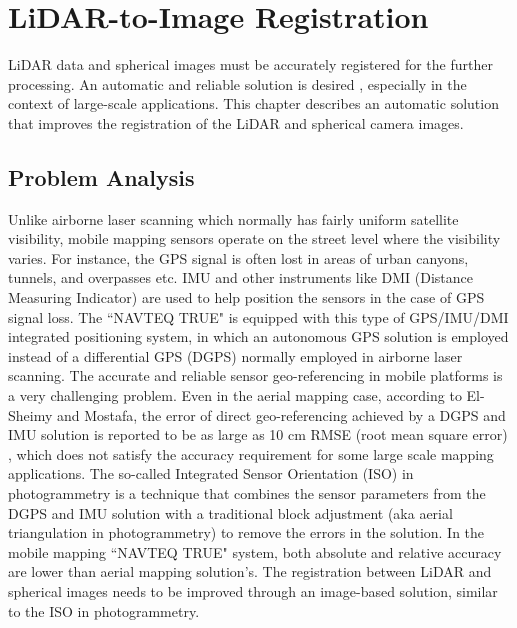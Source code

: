 \chapter{LiDAR-to-Image Registration}

LiDAR data and spherical images must be accurately registered for the further processing. An automatic and reliable solution is desired
, especially in the context of large-scale applications. This chapter describes an automatic solution that improves the registration of the LiDAR and spherical camera images. 

\section{Problem Analysis}

Unlike airborne laser scanning which normally has fairly uniform satellite visibility,  mobile mapping sensors operate on the street level where the  visibility varies. For instance, the GPS signal is often lost in areas of urban canyons, tunnels, and overpasses etc. IMU and other instruments like DMI (Distance Measuring Indicator) are used to help position the sensors in the case of GPS signal loss. The ``NAVTEQ TRUE" is equipped with this type of GPS/IMU/DMI integrated positioning system, in which an autonomous GPS solution is employed instead of a differential GPS (DGPS) normally employed in airborne laser scanning. The accurate and reliable sensor geo-referencing in mobile platforms is a very challenging problem. Even in the aerial mapping case, according to El-Sheimy and Mostafa, the error of direct geo-referencing achieved by a DGPS  and IMU solution is reported to be as large as 10 cm RMSE (root mean square error) \cite{IPNaser07}, which does not satisfy the accuracy requirement for some large scale mapping applications. The so-called Integrated Sensor Orientation (ISO) in photogrammetry is a technique that combines the sensor parameters from the DGPS and IMU solution with a traditional block adjustment (aka aerial triangulation in photogrammetry) to remove the errors in the solution. In the mobile mapping ``NAVTEQ TRUE" system, both absolute and relative accuracy are lower than aerial mapping solution's. The registration between LiDAR and spherical images needs to be improved through an image-based solution, similar to the ISO in photogrammetry. 


